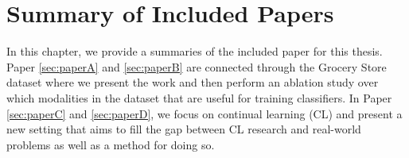 
\chapter{Summary of Included Papers}
\label{chap:summary_of_included_papers}

\noindent 
In this chapter, we provide a summaries of the included paper for this thesis. Paper \ref{sec:paperA} and \ref{sec:paperB} are connected through the Grocery Store dataset where we present the work and then perform an ablation study over which modalities in the dataset that are useful for training classifiers. In Paper \ref{sec:paperC} and \ref{sec:paperD}, we focus on continual learning (CL) and present a new setting that aims to fill the gap between CL research and real-world problems as well as a method for doing so. 

\begingroup
\renewcommand\thesection{\Alph{section}} %





\endgroup
